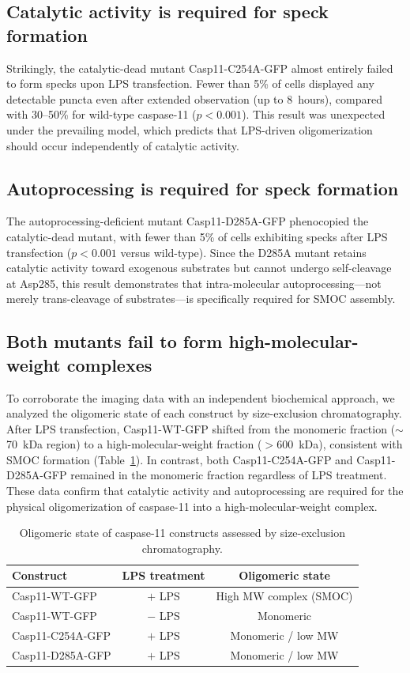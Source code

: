 \documentclass[11pt,a4paper]{article}
\begin{document}
\subsection{Catalytic activity is required for speck formation}

Strikingly, the catalytic-dead mutant Casp11-C254A-GFP almost entirely failed to form specks upon LPS transfection. Fewer than 5\% of cells displayed any detectable puncta even after extended observation (up to 8~hours), compared with 30--50\% for wild-type caspase-11 ($p < 0.001$). This result was unexpected under the prevailing model, which predicts that LPS-driven oligomerization should occur independently of catalytic activity.

\subsection{Autoprocessing is required for speck formation}

The autoprocessing-deficient mutant Casp11-D285A-GFP phenocopied the catalytic-dead mutant, with fewer than 5\% of cells exhibiting specks after LPS transfection ($p < 0.001$ versus wild-type). Since the D285A mutant retains catalytic activity toward exogenous substrates but cannot undergo self-cleavage at Asp285, this result demonstrates that intra-molecular autoprocessing---not merely trans-cleavage of substrates---is specifically required for SMOC assembly.

\subsection{Both mutants fail to form high-molecular-weight complexes}

To corroborate the imaging data with an independent biochemical approach, we analyzed the oligomeric state of each construct by size-exclusion chromatography. After LPS transfection, Casp11-WT-GFP shifted from the monomeric fraction ($\sim$70~kDa region) to a high-molecular-weight fraction ($>$600~kDa), consistent with SMOC formation (Table~\ref{tab:sec}). In contrast, both Casp11-C254A-GFP and Casp11-D285A-GFP remained in the monomeric fraction regardless of LPS treatment. These data confirm that catalytic activity and autoprocessing are required for the physical oligomerization of caspase-11 into a high-molecular-weight complex.

\begin{table}[htbp]
\centering
\caption{Oligomeric state of caspase-11 constructs assessed by size-exclusion chromatography.}
\label{tab:sec}
\begin{tabular}{@{}lcc@{}}
\toprule
\textbf{Construct} & \textbf{LPS treatment} & \textbf{Oligomeric state} \\
\midrule
Casp11-WT-GFP     & $+$ LPS & High MW complex (SMOC) \\
Casp11-WT-GFP     & $-$ LPS & Monomeric \\
Casp11-C254A-GFP  & $+$ LPS & Monomeric / low MW \\
Casp11-D285A-GFP  & $+$ LPS & Monomeric / low MW \\
\bottomrule
\end{tabular}
\end{table}
\end{document}

